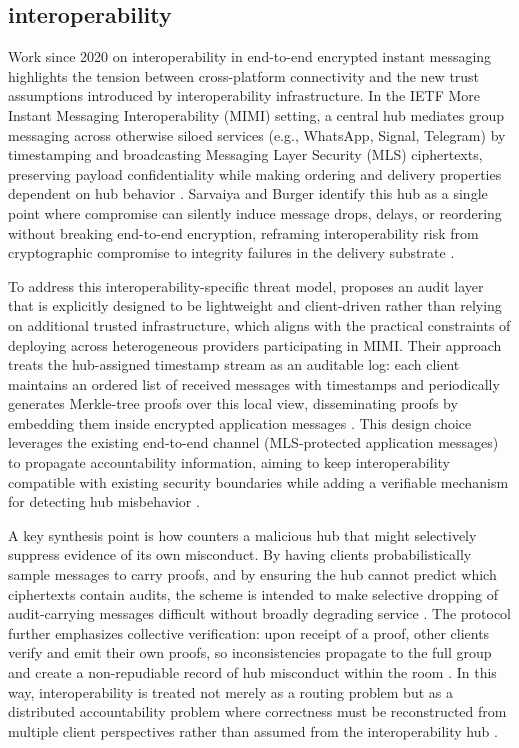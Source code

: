 \subsection{interoperability}
Work since 2020 on interoperability in end-to-end encrypted instant messaging highlights the tension between cross-platform connectivity and the new trust assumptions introduced by interoperability infrastructure. In the IETF More Instant Messaging Interoperability (MIMI) setting, a central hub mediates group messaging across otherwise siloed services (e.g., WhatsApp, Signal, Telegram) by timestamping and broadcasting Messaging Layer Security (MLS) ciphertexts, preserving payload confidentiality while making ordering and delivery properties dependent on hub behavior \cite{sarvaiya2025}. Sarvaiya and Burger identify this hub as a single point where compromise can silently induce message drops, delays, or reordering without breaking end-to-end encryption, reframing interoperability risk from cryptographic compromise to integrity failures in the delivery substrate \cite{sarvaiya2025}.

To address this interoperability-specific threat model, \cite{sarvaiya2025} proposes an audit layer that is explicitly designed to be lightweight and client-driven rather than relying on additional trusted infrastructure, which aligns with the practical constraints of deploying across heterogeneous providers participating in MIMI. Their approach treats the hub-assigned timestamp stream as an auditable log: each client maintains an ordered list of received messages with timestamps and periodically generates Merkle-tree proofs over this local view, disseminating proofs by embedding them inside encrypted application messages \cite{sarvaiya2025}. This design choice leverages the existing end-to-end channel (MLS-protected application messages) to propagate accountability information, aiming to keep interoperability compatible with existing security boundaries while adding a verifiable mechanism for detecting hub misbehavior \cite{sarvaiya2025}.

A key synthesis point is how \cite{sarvaiya2025} counters a malicious hub that might selectively suppress evidence of its own misconduct. By having clients probabilistically sample messages to carry proofs, and by ensuring the hub cannot predict which ciphertexts contain audits, the scheme is intended to make selective dropping of audit-carrying messages difficult without broadly degrading service \cite{sarvaiya2025}. The protocol further emphasizes collective verification: upon receipt of a proof, other clients verify and emit their own proofs, so inconsistencies propagate to the full group and create a non-repudiable record of hub misconduct within the room \cite{sarvaiya2025}. In this way, interoperability is treated not merely as a routing problem but as a distributed accountability problem where correctness must be reconstructed from multiple client perspectives rather than assumed from the interoperability hub \cite{sarvaiya2025}.

